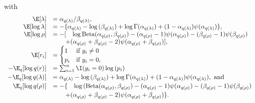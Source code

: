 \noindent with 
\[
	\begin{array}{rl}
	\E[\lambda] &= \alpha_{q(\lambda)}/\beta_{q(\lambda)}, \\
		\E [\log{\lambda}] & = -\{ \alpha_{q(\lambda)} - \log{(\beta_{q(\lambda)})} + \log{\Gamma(\alpha_{q(\lambda)})} + (1 - \alpha_{q(\lambda)}) \psi{(\alpha_{q(\lambda)})} \},        \\
		\E[\log{\rho}]     & = - [ \quad \log{\text{Beta}(\alpha_{q(\rho)}, \beta_{q(\rho)})} - (\alpha_{q(\rho)} - 1) \psi{(\alpha_{q(\rho)})} - (\beta_{q(\rho)} - 1)\psi{(\beta_{q(\rho)})}  \\
		                    & \qquad + (\alpha_{q(\rho)} + \beta_{q(\rho)} - 2)\psi{(\alpha_{q(\rho)} + \beta_{q(\rho)})} ],                                                               
		\\
		\E[r_i]            & =                                                                                                                                                             
		\begin{cases}
		1                   & \text{if } y_i \ne 0                                                                                                                                          \\
		p_i                 & \text{if } y_i = 0,                                                                                                                                           \\
		\end{cases}
		\\
		-\E_q[\log{q(r)}]  & = \sum_{i=1}^n \I(y_i = 0) \log{(p_i)}                                                                                                                        \\ [0.5ex]
		-\E_q[\log{q(\lambda)}] 
		                    & = \alpha_{q(\lambda)} - \log{(\beta_{q(\lambda)})} + \log{\Gamma{(\alpha_{q(\lambda)})}} + (1 - \alpha_{q(\lambda)}) \psi{(\alpha_{q(\lambda)})}, \text{ and }            \\ [0.5ex]
		\E_q[\log{q(\rho)}] & = - \{ \quad \log{(\text{Beta}(\alpha_{q(\rho)}, \beta_{q(\rho)})} - (\alpha_{q(\rho)} - 1) \psi{(\alpha_{q(\rho)})} - (\beta_{q(\rho)} - 1)\psi{(\beta_{q(\rho)})} \\ [0.5ex]
		                    & \qquad + (\alpha_{q(\rho)} + \beta_{q(\rho)} - 2)\psi{(\alpha_{q(\rho)} + \beta_{q(\rho)})} \}.                                                                \\ [0.5ex]
	\end{array}
\]

